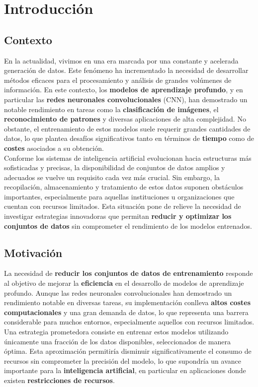 
\chapter{Introducción}\label{ch:introduccion}

\section{Contexto}\label{sec:contexto}
En la actualidad, vivimos en una era marcada por una constante y acelerada generación de datos.
Este fenómeno ha incrementado la necesidad de desarrollar métodos eficaces para el procesamiento y análisis de grandes
volúmenes de información.
En este contexto, los \textbf{modelos de aprendizaje profundo}, y en particular las
\textbf{redes neuronales convolucionales} (CNN), han demostrado un notable rendimiento en tareas como la
\textbf{clasificación de imágenes}, el \textbf{reconocimiento de patrones} y diversas aplicaciones de alta complejidad.
No obstante, el entrenamiento de estos modelos suele requerir grandes cantidades de datos, lo que plantea desafíos
significativos tanto en términos de \textbf{tiempo} como de \textbf{costes} asociados a su obtención. \\[6pt]


Conforme los sistemas de inteligencia artificial evolucionan hacia estructuras más sofisticadas y precisas, la
disponibilidad de conjuntos de datos amplios y adecuados se vuelve un requisito cada vez más crucial.
Sin embargo, la recopilación, almacenamiento y tratamiento de estos datos suponen obstáculos importantes, especialmente
para aquellas instituciones u organizaciones que cuentan con recursos limitados.
Esta situación pone de relieve la necesidad de investigar estrategias innovadoras que permitan
\textbf{reducir y optimizar los conjuntos de datos} sin comprometer el rendimiento de los modelos entrenados. \\[6pt]


\section{Motivación}\label{sec:motivacion}
La necesidad de \textbf{reducir los conjuntos de datos de entrenamiento} responde al objetivo de mejorar la
\textbf{eficiencia} en el desarrollo de modelos de aprendizaje profundo.
Aunque las redes neuronales convolucionales han demostrado un rendimiento notable en diversas tareas, su implementación
conlleva \textbf{altos costes computacionales} y una gran demanda de datos, lo que representa una barrera considerable
para muchos entornos, especialmente aquellos con recursos limitados.
Una estrategia prometedora consiste en entrenar estos modelos utilizando únicamente una fracción de los datos
disponibles, seleccionados de manera óptima.
Esta aproximación permitiría disminuir significativamente el consumo de recursos sin comprometer la precisión del
modelo, lo que supondría un avance importante para la \textbf{inteligencia artificial}, en particular en aplicaciones
donde existen \textbf{restricciones de recursos}. \\[6pt]

